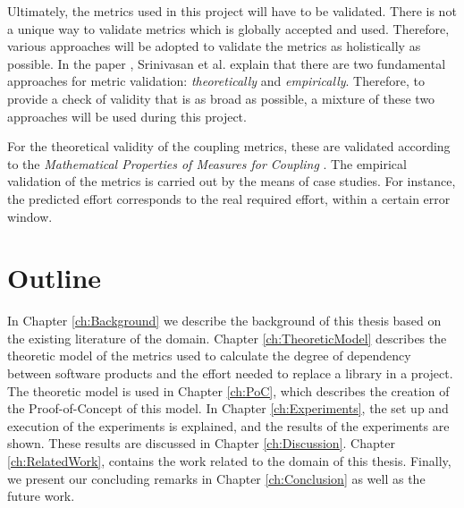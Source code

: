 Ultimately, the metrics used in this project will have to be validated. There is not a unique way to validate metrics which is globally accepted and used. Therefore, various approaches will be adopted to validate the metrics as holistically as possible. In the paper \cite{srinivasan2014software}, Srinivasan et al. explain that there are two fundamental approaches for metric validation: \textit{theoretically} and \textit{empirically}. Therefore, to provide a check of validity that is as broad as possible, a mixture of these two approaches will be used during this project.

For the theoretical validity of the coupling metrics, these are validated according to the \textit{Mathematical Properties of Measures for Coupling} \cite{srinivasan2014software}.
The empirical validation of the metrics is carried out by the means of case studies. For instance, the predicted effort corresponds to the real required effort, within a certain error window.

\section{Outline}
In Chapter \ref{ch:Background} we describe the background of this thesis based on the existing literature of the domain.
Chapter \ref{ch:TheoreticModel} describes the theoretic model of the metrics used to calculate the degree of dependency between software products and the effort needed to replace a library in a project.
The theoretic model is used in Chapter \ref{ch:PoC}, which describes the creation of the Proof-of-Concept of this model.
In Chapter \ref{ch:Experiments}, the set up and execution of the experiments is explained, and the results of the experiments are shown. These results are discussed in Chapter \ref{ch:Discussion}. Chapter \ref{ch:RelatedWork}, contains the work related to the domain of this thesis.
Finally, we present our concluding remarks in Chapter \ref{ch:Conclusion} as well as the future work.
